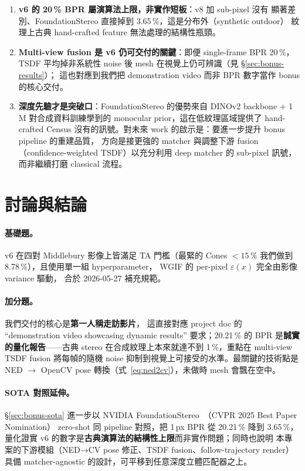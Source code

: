 \documentclass[11pt,a4paper]{article}
\begin{document}
\begin{enumerate}[leftmargin=2em,itemsep=2pt]
\item \textbf{v6 的 20\,\% BPR 屬演算法上限，非實作短板}：v8 加 sub-pixel 沒有
顯著差別、FoundationStereo 直接掉到 3.65\,\%，這是分布外（synthetic outdoor）
紋理上古典 hand-crafted feature 無法處理的結構性瓶頸。
\item \textbf{Multi-view fusion 是 v6 仍可交付的關鍵}：即便 single-frame BPR 20\,\%，
TSDF 平均掉非系統性 noise 後 mesh 在視覺上仍可辨識（見 §\ref{sec:bonus-results}）；
這也對應到我們把 demonstration video 而非 BPR 數字當作 bonus 的核心交付。
\item \textbf{深度先驗才是突破口}：FoundationStereo 的優勢來自 DINOv2 backbone
+ 1\,M 對合成資料訓練學到的 monocular prior，這在低紋理區域提供了 hand-crafted
Census 沒有的訊號。對未來 work 的啟示是：要進一步提升 bonus pipeline 的重建品質，
方向是接更強的 matcher 與調整下游 fusion（confidence-weighted TSDF）以充分利用
deep matcher 的 sub-pixel 訊號，而非繼續打磨 classical 流程。
\end{enumerate}

\section{討論與結論}

\paragraph{基礎題。} v6 在四對 Middlebury 影像上皆滿足 TA 門檻（最緊的
Cones $<\!15\,\%$ 我們做到 8.78\,\%），且使用單一組 hyperparameter，
WGIF 的 per-pixel $\varepsilon(x)$ 完全由影像 variance 驅動，
合於 2026-05-27 補充規範。

\paragraph{加分題。} 我們交付的核心是\textbf{第一人稱走訪影片}，
這直接對應 project doc 的 ``demonstration video showcasing dynamic
results'' 要求；20.21\,\% 的 BPR 是\textbf{誠實的量化報告}——古典 stereo
在合成紋理上本來就達不到 1\,\%，重點在 multi-view TSDF fusion 將每幀的隨機
noise 抑制到視覺上可接受的水準。最關鍵的技術點是 NED $\to$ OpenCV pose
轉換（式~\ref{eq:ned2cv}），未做時 mesh 會飄在空中。

\paragraph{SOTA 對照延伸。} §\ref{sec:bonus-sota} 進一步以
NVIDIA FoundationStereo~\cite{Wen2025}（CVPR 2025 Best Paper Nomination）
zero-shot 同 pipeline 對照，把 1\,px BPR 從 20.21\,\% 降到 3.65\,\%，
量化證實 v6 的數字是\textbf{古典演算法的結構性上限}而非實作問題；同時也說明
本專案的下游模組（NED→CV pose 修正、TSDF fusion、follow-trajectory render）
具備 matcher-agnostic 的設計，可平移到任意深度立體匹配器之上。
\end{document}
